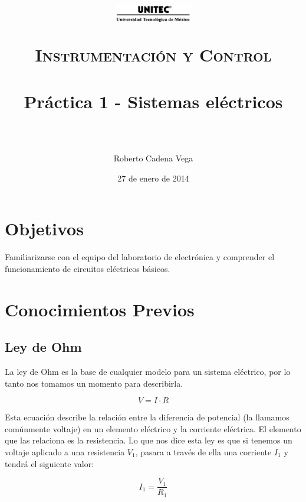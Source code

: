 \documentclass[paper=letter, fontsize=11pt]{scrartcl} %
\title{	
	\normalfont \normalsize
	\begin{figure}[h]
		\begin{center}
			\includegraphics[width=0.3\textwidth]{UNITEC.png} %
		\end{center}
	\end{figure}
	\textsc{Instrumentación y Control} \\ [25pt]
	\horrule{0.5pt} \\[0.4cm] %
	\huge Práctica 1 - Sistemas eléctricos \\ %
	\horrule{2pt} \\[0.5cm] %
}
\author{Roberto Cadena Vega} %
\date{\normalsize 27 de enero de 2014} %
\numberwithin{equation}{section} %
\numberwithin{figure}{section} %
\numberwithin{table}{section} %
\begin{document}
\maketitle %


\section{Objetivos}

	Familiarizarse con el equipo del laboratorio de electrónica y comprender el funcionamiento de circuitos eléctricos básicos.


\section{Conocimientos Previos}


	\subsection{Ley de Ohm}

		La ley de Ohm es la base de cualquier modelo para un sistema eléctrico, por lo tanto nos tomamos un momento para describirla.

		\begin{equation}
			V = I \cdot R
		\end{equation}

		Esta ecuación describe la relación entre la diferencia de potencial (la llamamos comúnmente voltaje) en un elemento eléctrico y la corriente eléctrica. El elemento que las relaciona es la resistencia. Lo que nos dice esta ley es que si tenemos un voltaje aplicado a una resistencia $V_1$, pasara a través de ella una corriente $I_1$ y tendrá el siguiente valor:

		\begin{equation}
			I_1 = \frac{V_1}{R_1}
		\end{equation}
\end{document}
